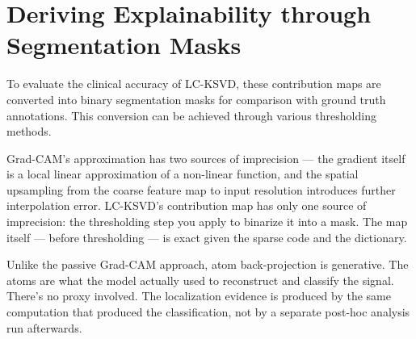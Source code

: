 \section{Deriving Explainability through Segmentation Masks}
To evaluate the clinical accuracy of LC-KSVD, these contribution maps are converted into binary segmentation masks for
comparison with ground truth annotations. This conversion can be achieved through various thresholding methods.

Grad-CAM's approximation has two sources of imprecision — the gradient itself is a local linear approximation of a non-linear
function, and the spatial upsampling from the coarse feature map to input resolution introduces further interpolation error. 
LC-KSVD's contribution map has only one source of imprecision: the thresholding step you apply to binarize it into a mask.
The map itself — before thresholding — is exact given the sparse code and the dictionary.


Unlike the passive Grad-CAM approach, atom back-projection is generative. The atoms are what the model actually used to
reconstruct and classify the signal. There's no proxy involved. The localization evidence is produced by the same
computation that produced the classification, not by a separate post-hoc analysis run afterwards.



